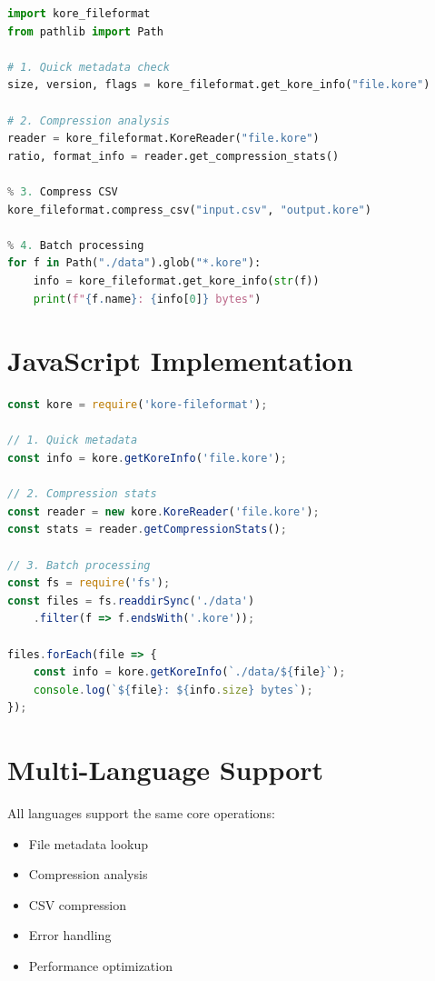 \documentclass[12pt,a4paper]{report}
\begin{document}
\begin{lstlisting}[language=Python]
import kore_fileformat
from pathlib import Path

# 1. Quick metadata check
size, version, flags = kore_fileformat.get_kore_info("file.kore")

# 2. Compression analysis
reader = kore_fileformat.KoreReader("file.kore")
ratio, format_info = reader.get_compression_stats()

% 3. Compress CSV
kore_fileformat.compress_csv("input.csv", "output.kore")

% 4. Batch processing
for f in Path("./data").glob("*.kore"):
    info = kore_fileformat.get_kore_info(str(f))
    print(f"{f.name}: {info[0]} bytes")
\end{lstlisting}

\section{JavaScript Implementation}

\begin{lstlisting}[language=JavaScript]
const kore = require('kore-fileformat');

// 1. Quick metadata
const info = kore.getKoreInfo('file.kore');

// 2. Compression stats
const reader = new kore.KoreReader('file.kore');
const stats = reader.getCompressionStats();

// 3. Batch processing
const fs = require('fs');
const files = fs.readdirSync('./data')
    .filter(f => f.endsWith('.kore'));

files.forEach(file => {
    const info = kore.getKoreInfo(`./data/${file}`);
    console.log(`${file}: ${info.size} bytes`);
});
\end{lstlisting}

\section{Multi-Language Support}

All languages support the same core operations:

\begin{itemize}
    \item \checkmark{} File metadata lookup
    \item \checkmark{} Compression analysis
    \item \checkmark{} CSV compression
    \item \checkmark{} Error handling
    \item \checkmark{} Performance optimization
\end{itemize}
\end{document}
